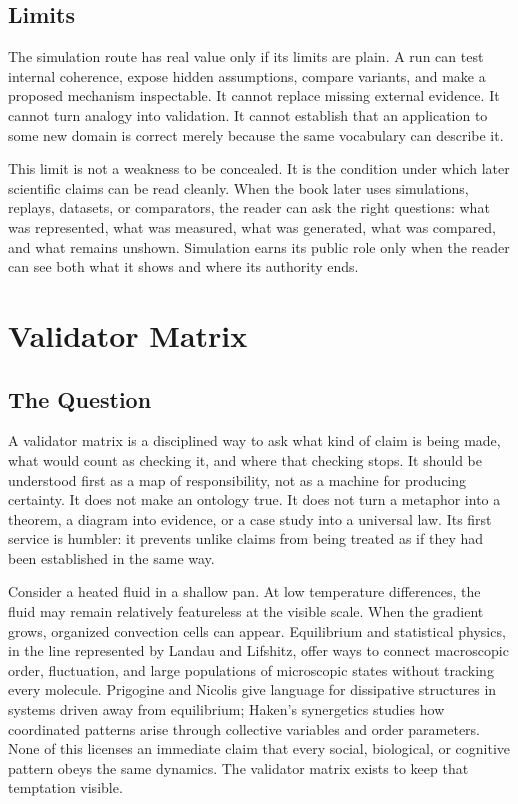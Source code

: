 \documentclass[11pt,a4paper,openany]{book}
\begin{document}
\subsection{Limits}
The simulation route has real value only if its limits are plain. A run can test internal coherence, expose hidden assumptions, compare variants, and make a proposed mechanism inspectable. It cannot replace missing external evidence. It cannot turn analogy into validation. It cannot establish that an application to some new domain is correct merely because the same vocabulary can describe it. \cite{wilson_renormalization,landau_stat_physics}\par
This limit is not a weakness to be concealed. It is the condition under which later scientific claims can be read cleanly. When the book later uses simulations, replays, datasets, or comparators, the reader can ask the right questions: what was represented, what was measured, what was generated, what was compared, and what remains unshown. Simulation earns its public role only when the reader can see both what it shows and where its authority ends.\par
\section{Validator Matrix}
\subsection{The Question}
A validator matrix is a disciplined way to ask what kind of claim is being made, what would count as checking it, and where that checking stops. It should be understood first as a map of responsibility, not as a machine for producing certainty. It does not make an ontology true. It does not turn a metaphor into a theorem, a diagram into evidence, or a case study into a universal law. Its first service is humbler: it prevents unlike claims from being treated as if they had been established in the same way. \cite{landau_stat_physics,prigogine_dissipative}\par
Consider a heated fluid in a shallow pan. At low temperature differences, the fluid may remain relatively featureless at the visible scale. When the gradient grows, organized convection cells can appear. Equilibrium and statistical physics, in the line represented by Landau and Lifshitz, offer ways to connect macroscopic order, fluctuation, and large populations of microscopic states without tracking every molecule. Prigogine and Nicolis give language for dissipative structures in systems driven away from equilibrium; Haken's synergetics studies how coordinated patterns arise through collective variables and order parameters. None of this licenses an immediate claim that every social, biological, or cognitive pattern obeys the same dynamics. The validator matrix exists to keep that temptation visible.\par
\end{document}
